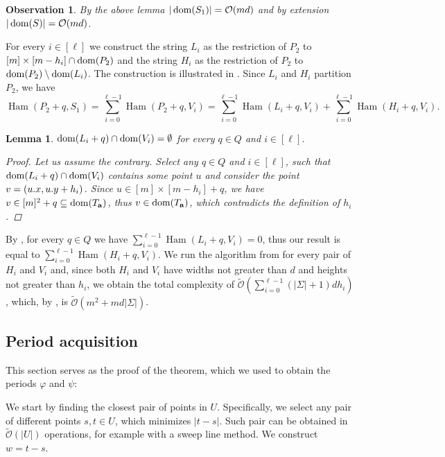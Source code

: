 \documentclass[11pt, letterpaper]{article}
\theoremstyle{plain}
\newtheorem{lemma}{Lemma}
\newtheorem{observation}{Observation}
\theoremstyle{definition}
\theoremstyle{remark}
\renewcommand{\O}{\mathcal{O}}
\newcommand{\tO}{\tilde{\mathcal{O}}}
\renewcommand{\phi}{\varphi}
\DeclareMathOperator*{\Ham}{Ham}
\begin{document}
\begin{observation}\label{area_bound}
	By the above lemma $|\d{S_1}| = \O(md)$ and by extension $|\d{S}| = \O(md)$.
\end{observation}

For every $i \in [\ell]$ we construct the string $L_i$ as the restriction of $P_2$ to $[m] \times [m - h_i] \cap \operatorname*{dom}(P_2)$
and the string $H_i$ as the restriction of $P_2$ to $\operatorname*{dom}(P_2) \setminus \operatorname*{dom}(L_i)$.
The construction is illustrated in .
Since $L_i$ and $H_i$ partition $P_2$, we have
\[ \Ham(P_2 + q, S_1) = \sum_{i = 0}^{\ell - 1} \Ham(P_2 + q, V_i) = \sum_{i = 0}^{\ell - 1} \Ham(L_i + q, V_i) + \sum_{i = 0}^{\ell - 1} \Ham(H_i + q, V_i). \]

\begin{lemma}\label{pattern_height_reduction}
	$\operatorname*{dom}(L_i + q) \cap \operatorname*{dom}(V_i) = \emptyset$ for every $q \in Q$ and $i \in [\ell]$.
	\begin{proof}
		Let us assume the contrary.
		Select any $q \in Q$ and $i \in [\ell]$, such that $\operatorname*{dom}(L_i + q) \cap \operatorname*{dom}(V_i)$ 
		contains some point $u$ and consider the point $v = (u.x, u.y + h_i)$.
		Since $u \in [m] \times [m - h_i] + q$, we have $v \in [m]^2 + q \subseteq \operatorname*{dom}(T_\mathbf{a})$, thus $v \in \operatorname*{dom}(T_\mathbf{a})$, which contradicts the definition of $h_i$.
	\end{proof}
\end{lemma}

By , for every $q \in Q$ we have $\sum_{i = 0}^{\ell - 1} \Ham(L_i + q, V_i) = 0$, thus our result is equal to $\sum_{i = 0}^{\ell - 1} \Ham(H_i + q, V_i)$.
We run the algorithm from  for every pair of $H_i$ and $V_i$ and, since both $H_i$ and $V_i$ have widths not greater than $d$ and heights not greater than $h_i$, we obtain the total complexity of $\tO(\sum_{i = 0}^{\ell - 1} (|\Sigma| + 1)dh_i)$, 
which, by , is $\tO(m^2 + md|\Sigma|)$.


\subsection{Period acquisition} \label{get_periods_proof}

This section serves as the proof of the theorem, which we used to obtain the periods $\phi$ and $\psi$:

\GetPeriods

We start by finding the closest pair of points in $U$.
Specifically, we select any pair of different points $s, t \in U$, which minimizes $|t - s|$. 
Such pair can be obtained in $\tO(|U|)$ operations, for example with a sweep line method.
We construct $w = t - s$.
\end{document}
